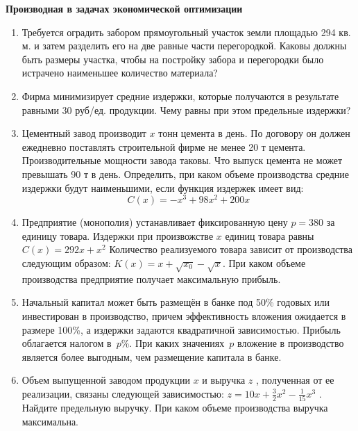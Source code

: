 \documentclass[a5paper,11pt]{extarticle}
\begin{document}
{
\bfseries Производная в задачах экономической оптимизации
\par\vspace{1mm}
}
\begin{enumerate}
    \item 
        Требуется оградить забором прямоугольный участок земли площадью 294 кв. м. и затем разделить его на две равные части перегородкой. Каковы должны быть размеры участка, чтобы на постройку забора и перегородки было истрачено наименьшее количество материала?    
    \item 
        Фирма минимизирует средние издержки, которые получаются в результате равными 30 руб/ед. продукции. Чему равны при этом предельные издержки?

    \item 
    Цементный завод производит $x$ тонн цемента в день. По договору он должен ежедневно поставлять строительной фирме не менее 20 т цемента. Производительные мощности завода таковы. Что выпуск цемента не может превышать 90 т в день. Определить, при каком объеме производства средние издержки будут наименьшими, если функция издержек имеет вид:
    $$
        C(x) = -x^3+98x^2+200x
    $$

    \item 
        Предприятие (монополия) устанавливает фиксированную цену $p=380$ за единицу товара. 
        Издержки при произвожстве $x$ единиц товара равны $C(x)=292x+x^2$
        Количество реализуемого товара зависит от производства следующим образом:
        $K(x)=x+\sqrt{x_0}-\sqrt{x}$. При каком объеме производства предприятие получает максимальную прибыль.



        \item Начальный капитал может быть размещён в банке под 50\% годовых или
инвестирован в производство, причем эффективность вложения ожидается в
размере 100\%, а издержки задаются квадратичной зависимостью. Прибыль
облагается налогом в~$p$\%. При каких значениях~$p$
вложение в производство является более выгодным, чем размещение
капитала в банке.

    \item 
        Объем выпущенной заводом продукции  $x$  и выручка  $z$ , полученная от ее реализации, связаны следующей зависимостью:
        $z=10x+\frac 3 2x^2-\frac 1{15}x^3$ .
       Найдите предельную выручку. При каком объеме производства выручка максимальна. 


\end{enumerate}
\end{document}
